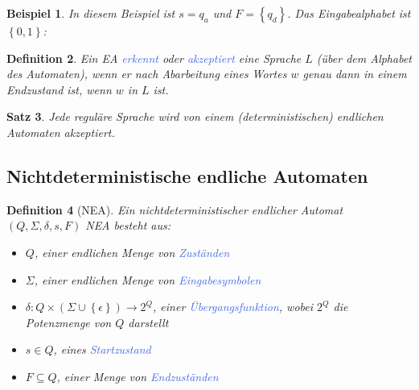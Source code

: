 \documentclass[11pt]{article}
\newcommand{\tcol}[1]{\textcolor{RoyalBlue}{#1}}
\newcommand{\set}[1]{\left\lbrace #1\right\rbrace}
\theoremstyle{break}
\newtheorem{satz}{Satz}[section]
\newtheorem{defi}[satz]{Definition}
\newtheorem{beis}[satz]{Beispiel}
\begin{document}
\begin{beis}
In diesem Beispiel ist $s=q_a$ und $F=\set{q_d}$. Das Eingabealphabet ist $\set{0,1}$:\\
\begin{center}
\end{center}
\end{beis}

\begin{defi}
Ein EA \tcol{erkennt} oder \tcol{akzeptiert} eine Sprache $L$ (über dem Alphabet des Automaten), wenn er nach Abarbeitung eines Wortes $w$ genau dann in einem Endzustand ist, wenn $w$ in $L$ ist.
\end{defi}

\begin{satz}
Jede reguläre Sprache wird von einem (deterministischen) endlichen Automaten akzeptiert.
\end{satz}


\subsection{Nichtdeterministische endliche Automaten}

\begin{defi}[NEA]
Ein nichtdeterministischer endlicher Automat $(Q,\Sigma ,\delta ,s,F)$ NEA besteht aus:
\begin{itemize}
\item $Q$, einer endlichen Menge von \tcol{Zuständen}
\item $\Sigma$, einer endlichen Menge von \tcol{Eingabesymbolen}
\item $\delta\colon Q\times (\Sigma\cup\set{\epsilon})\to 2^Q$, einer \tcol{Übergangsfunktion}, wobei $2^Q$ die Potenzmenge von $Q$ darstellt
\item $s\in Q$, eines \tcol{Startzustand}
\item $F\subseteq Q$, einer Menge von \tcol{Endzuständen}
\end{itemize}
\end{defi}
\end{document}
